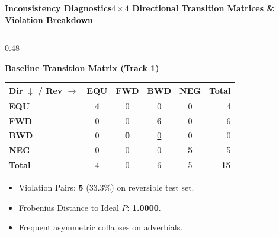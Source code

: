 \documentclass[aspectratio=169,10pt]{beamer}
\begin{document}
\begin{frame}{\textbf{Inconsistency Diagnostics}}{\textbf{$4 \times 4$ Directional Transition Matrices \& Violation Breakdown}}
  \begin{columns}[T]
    \begin{column}{0.48\textwidth}
      \begin{block}{\textbf{Baseline Transition Matrix (Track 1)}}
        \centering
        \scriptsize
        \setlength{\tabcolsep}{2.5pt}
        \vspace{0.05cm}
        \begin{tabular}{l|cccc|r}
          \toprule
          \textbf{Dir $\downarrow$ / Rev $\rightarrow$} & \textbf{EQU} & \textbf{FWD} & \textbf{BWD} & \textbf{NEG} & \textbf{Total} \\
          \midrule
          \textbf{EQU} & \textbf{4} & 0 & 0 & 0 & 4 \\
          \textbf{FWD} & 0 & \underline{0} & \textbf{6} & 0 & 6 \\
          \textbf{BWD} & 0 & \textbf{0} & \underline{0} & 0 & 0 \\
          \textbf{NEG} & 0 & 0 & 0 & \textbf{5} & 5 \\
          \midrule
          \textbf{Total} & 4 & 0 & 6 & 5 & \textbf{15} \\
          \bottomrule
        \end{tabular}
        \vspace{0.05cm}
        \begin{itemize}\setlength{\itemsep}{0pt}\setlength{\parskip}{0pt}
          \item Violation Pairs: \textbf{5} (33.3\%) on reversible test set.
          \item Frobenius Distance to Ideal $P$: \textbf{1.0000}.
          \item Frequent asymmetric collapses on adverbials.
        \end{itemize}
      \end{block}
    \end{column}


\end{columns}
\end{frame}
\end{document}

